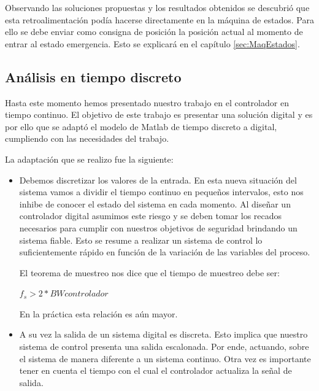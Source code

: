\documentclass[journal]{IEEEtran}
\begin{document}
Observando las soluciones propuestas y los resultados obtenidos se descubrió que esta 
retroalimentación podía hacerse directamente en la máquina de estados. Para ello se debe
enviar como consigna de posición la posición actual al momento de entrar al estado 
emergencia.
Esto se explicará en el capítulo \ref{sec:MaqEstados}.


\subsection{Análisis en tiempo discreto}
Hasta este momento hemos presentado nuestro trabajo en el controlador en tiempo continuo.
El objetivo de este trabajo es presentar una solución digital y es por ello que se adaptó
el modelo de Matlab de tiempo discreto a digital, cumpliendo con las necesidades del
trabajo. 

La adaptación que se realizo fue la siguiente:
\begin{itemize}
 \item Debemos discretizar los valores de la entrada. En esta nueva situación del sistema 
vamos a dividir el tiempo continuo en pequeños intervalos, esto nos inhibe de conocer
el estado del sistema en cada momento. Al diseñar un controlador digital asumimos este
riesgo y se deben tomar los recados necesarios para cumplir con nuestros objetivos de 
seguridad brindando un sistema fiable. Esto se resume a realizar un sistema de control 
lo suficientemente rápido en función de la variación de las variables del proceso.

El teorema de muestreo nos dice que el tiempo de muestreo debe ser:

$ f_s > 2*BWcontrolador $

En la práctica esta relación es aún mayor.

\item A su vez la salida de un sistema digital es discreta. Esto implica 
que nuestro sistema de control presenta una salida escalonada. Por ende, 
actuando, sobre el sistema de manera diferente a un sistema continuo. Otra 
vez es importante tener en cuenta el tiempo con el cual el controlador actualiza
la señal de salida.
\end{itemize}
\end{document}
